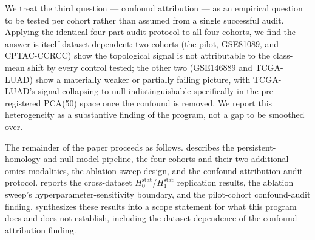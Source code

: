 We treat the third question --- confound attribution --- as an empirical question to be tested per cohort rather than assumed from a single successful audit. Applying the identical four-part audit protocol to all four cohorts, we find the answer is itself dataset-dependent: two cohorts (the pilot, GSE81089, and CPTAC-CCRCC) show the topological signal is not attributable to the class-mean shift by every control tested; the other two (GSE146889 and TCGA-LUAD) show a materially weaker or partially failing picture, with TCGA-LUAD's signal collapsing to null-indistinguishable specifically in the pre-registered PCA(50) space once the confound is removed. We report this heterogeneity as a substantive finding of the program, not a gap to be smoothed over.

The remainder of the paper proceeds as follows.  describes the persistent-homology and null-model pipeline, the four cohorts and their two additional omics modalities, the ablation sweep design, and the confound-attribution audit protocol.  reports the cross-dataset $H_0^{\text{stat}}$/$H_1^{\text{stat}}$ replication results, the ablation sweep's hyperparameter-sensitivity boundary, and the pilot-cohort confound-audit finding.  synthesizes these results into a scope statement for what this program does and does not establish, including the dataset-dependence of the confound-attribution finding.
